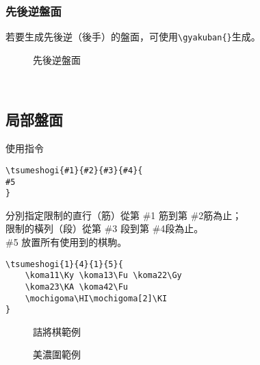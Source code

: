 \subsubsection{先後逆盤面}
若要生成先後逆（後手）的盤面，可使用\verb|\gyakuban{}|生成。\\
\begin{figure}[h]
    \centering
    \caption{先後逆盤面}
    \label{fig:my_label}
\end{figure}\\

\subsection{局部盤面}
使用指令
\begin{lstlisting}
\tsumeshogi{#1}{#2}{#3}{#4}{
#5
}
\end{lstlisting}
分別指定限制的直行（筋）從第 \#1 筋到第 \#2筋為止；\\
限制的橫列（段）從第 \#3 段到第 \#4段為止。\\
\#5 放置所有使用到的棋駒。
\begin{lstlisting}
\tsumeshogi{1}{4}{1}{5}{
    \koma11\Ky \koma13\Fu \koma22\Gy
    \koma23\KA \koma42\Fu
    \mochigoma\HI\mochigoma[2]\KI
}
\end{lstlisting}

\begin{figure}[h]
  \begin{minipage}[h]{0.5\linewidth}
    \centering
    \caption{詰將棋範例}
    \label{fig:side:a}
  \end{minipage}%
  \begin{minipage}[h]{0.5\linewidth}
    \centering
    \caption{美濃圍範例}
    \label{fig:side:b}
  \end{minipage}
\end{figure}

\newpage